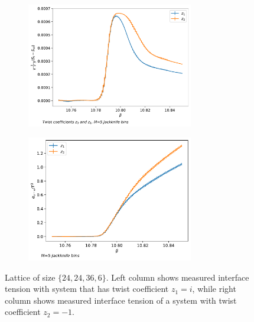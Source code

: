 \documentclass[english,twoside,openright]{UH_TCM_MSc}
\begin{document}
\begin{figure}[htb]
    \centering
    \begin{subfigure}[t]{\textwidth}
        \centering
        \includegraphics[width=0.8\textwidth]{final_plots/24_24_36_highlight/action_diff.pdf}
    \end{subfigure}
    \begin{subfigure}[t]{\textwidth}
        \centering
        \includegraphics[width=0.8\textwidth]{final_plots/24_24_36_highlight/action_diff_int.pdf}
    \end{subfigure}
    \caption{Lattice of size $\{24,24,36,6\}$. Left column shows measured interface tension with system that has twist coefficient $z_1 = i$, while right column shows measured interface tension of a system with twist coefficient $z_2 = -1$.} 
    \label{fig:2424366_twist_comparison}
\end{figure}
\end{document}
